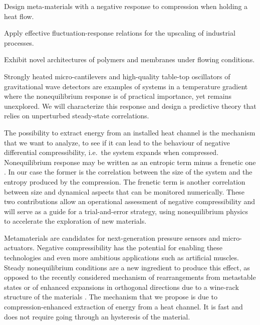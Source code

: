 \begin{workpackage}[id=WPcompress,wphases=0-48,
  short=Nonequilibrium compressibility, %
  title=Nonequilibrium compressibility, %
  lead=UNIPD,
  UNIPDRM=72,
  KULRM=12]

\newrefsection

\begin{mdframed}
\mobjectives
%
  \begin{compactitem}
  \item Design meta-materials with a negative response to compression when holding a heat flow.
  \item Apply effective fluctuation-response relations for the upscaling of industrial processes.
  \item Exhibit novel architectures of polymers and membranes under flowing conditions.
  \end{compactitem}

\mdescription
%
Strongly heated micro-cantilevers \cite{AGBB15} and high-quality table-top oscillators of
gravitational wave detectors \cite{Cet13} are examples of systems in a temperature gradient
where the nonequilibrium response is of practical importance, yet remains unexplored.
%
We will characterize this response and design a predictive theory that relies on unperturbed
steady-state correlations.

The possibility to extract energy from an installed heat channel is the mechanism that we want to
analyze, to see if it can lead to the behaviour of negative differential compressibility,
i.e.~the system expands when compressed. 
Nonequilibrium response may be written as an entropic term minus a frenetic one \cite{BMW09}.
In our case the former is the correlation between the size of the system and the entropy produced by the compression.
The frenetic term is another correlation between size and dynamical aspects that can be monitored numerically.
%
These two contributions allow an operational assessment of negative compressibility and will
serve as a guide for a trial-and-error strategy, using nonequilibrium physics to accelerate the
exploration of new materials.

Metamaterials \cite{NM12,CG15} are candidates for next-generation pressure sensors and
micro-actuators. Negative compressibility has the potential for enabling these technologies
and even more ambitious applications such as artificial muscles.
%
Steady nonequilibrium conditions are a new ingredient to produce this effect, as opposed to the recently considered
mechanism of rearrangements from metastable states \cite{NM12} or of enhanced expansions in orthogonal directions
due to a wine-rack structure of the materials \cite{CG15}.
%
The mechanism that we propose is due to compression-enhanced extraction of energy from a
heat channel. It is fast and does not require going through an hysteresis of the material.


\end{mdframed}
\end{workpackage}

